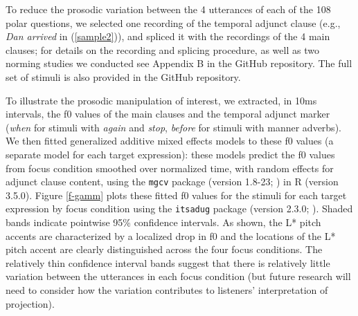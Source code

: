 \documentclass[a4paper,12pt]{article}
\newcommand{\6}{\mbox{$[\hspace*{-.6mm}[$}}
\newcommand{\9}{\mbox{$]\hspace*{-.6mm}]$}}
\begin{document}
To reduce the prosodic variation between the 4 utterances of each of the 108 polar questions, we selected one recording of the temporal adjunct clause (e.g., {\em Dan arrived} in (\ref{sample2})), and spliced it with the recordings of the 4 main clauses; for details on the recording and splicing procedure, as well as two norming studies we conducted see Appendix B in the GitHub repository. The full set of stimuli is also provided in the GitHub repository.

To illustrate the prosodic manipulation of interest, we extracted, in 10ms intervals, the f0 values of the main clauses and the temporal adjunct marker ({\em when} for stimuli with {\em again} and {\em stop}, {\em before} for stimuli with manner adverbs). We then fitted generalized additive mixed effects models to these f0 values (a separate model for each target expression): these models predict the f0 values from focus condition smoothed over normalized time, with random effects for adjunct clause content, using the {\tt mgcv} package (version 1.8-23; \citealt{wood2011,wood2017}) in R (version 3.5.0). Figure \ref{f-gamm} plots these fitted f0 values for the stimuli for each target expression by focus condition using the {\tt itsadug} package (version 2.3.0; \citealt{van-rij-etal2017}). Shaded bands indicate pointwise 95\% confidence intervals. As shown, the L* pitch accents are characterized by a localized drop in f0 and the locations of the L* pitch accent are clearly distinguished across the four focus conditions. The relatively thin confidence interval bands suggest that there is relatively little variation between the utterances in each focus condition (but future research will need to consider how the variation contributes to listeners' interpretation of projection).
\end{document}

